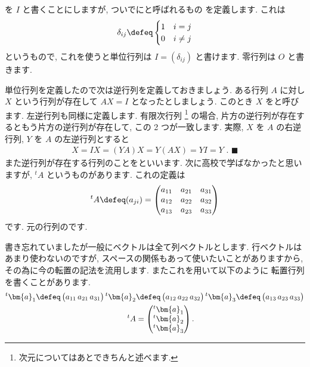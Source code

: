 \documentclass[openany, a4paper, oneside]{jsbook}
\begin{document}
を $I$ と書くことにしますが,
ついでにと呼ばれるもの
を定義します. これは
\begin{align}
    \delta _{ij} \defeq \begin{cases} 1 & i = j \\
0 & i \not = j
\end{cases}
\end{align}
というもので, これを使うと単位行列は $I = (\delta _{ij})$ と書けます.
零行列は $O$ と書きます.

単位行列を定義したので次は逆行列を定義しておきましょう.
ある行列 $A$ に対し $X$ という行列が存在して $AX = I$ となったとしましょう. このとき $X$ をと呼びます.
左逆行列も同様に定義します. 有限次行列 \footnote{次元についてはあとできちんと述べます.}
の場合, 片方の逆行列が存在するともう片方の逆行列が存在して, この 2 つが一致します.
実際,  $X$ を $A$ の右逆行列,  $Y$ を $A$ の左逆行列とすると
\begin{align}
    X = IX = (Y A) X = Y (A X) = Y I = Y \,\, . \,\, \blacksquare
\end{align}
また逆行列が存在する行列のことをといいます.
次に高校で学ばなかったと思いますが,  ${^t}A$ というものがあります. これの定義は
\begin{align}
    {^t}A \defeq (a_{j i})
    = \begin{pmatrix}
        a_{11} & a_{21} & a_{31} \\
        a_{12} & a_{22} & a_{32} \\
        a_{13} & a_{23} & a_{33}
    \end{pmatrix}
\end{align}
です. 元の行列のです.

書き忘れていましたが一般にベクトルは全て列ベクトルとします. 行ベクトルはあまり使わないのですが,
スペースの関係もあって使いたいことがありますから, その為に今の転置の記法を流用します. またこれを用いて以下のように
転置行列を書くことがあります.
\begin{align}
    {^t}\bm{a}_{1} \defeq \begin{pmatrix}  a_{11} \, a_{21} \, a_{31} \end{pmatrix}
    {^t}\bm{a}_{2} &\defeq \begin{pmatrix}  a_{12} \, a_{22} \, a_{32} \end{pmatrix}
    {^t}\bm{a}_{3} \defeq \begin{pmatrix}  a_{13} \, a_{23} \, a_{33} \end{pmatrix} \\
    {^t}A &= \begin{pmatrix} {^t}\bm{a}_{1} \\ {^t}\bm{a}_{2} \\ {^t}\bm{a}_{3}\end{pmatrix} .
\end{align}
\end{document}
